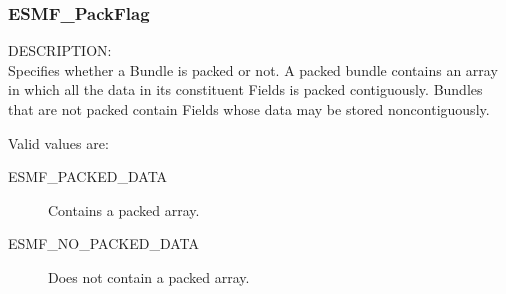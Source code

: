 
\subsubsection{ESMF\_PackFlag}

{\sf DESCRIPTION:\\}
Specifies whether a Bundle is packed or not.  A packed 
bundle contains an array in which all the data in its 
constituent Fields is packed contiguously.  Bundles that
are not packed contain Fields whose data may be stored
noncontiguously.

Valid values are:
\begin{description}
   \item [ESMF\_PACKED\_DATA] 
         Contains a packed array.
   \item [ESMF\_NO\_PACKED\_DATA]
         Does not contain a packed array.
\end{description}
